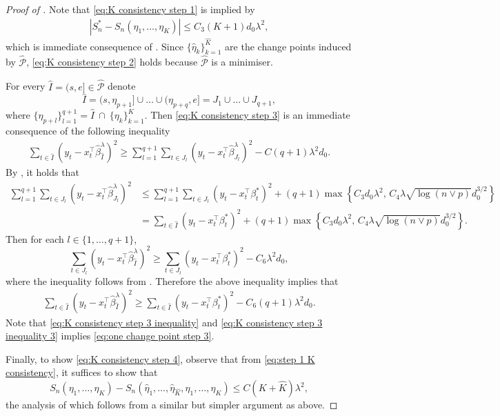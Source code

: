 \documentclass[twoside]{article}
\newcommand{\hatp}{ \widehat {\mathcal P}}
\begin{document}
\begin{proof}[Proof of ]
Note that \eqref{eq:K consistency step 1}  is implied by 
	\begin{align}\label{eq:step 1 K consistency}  
		\left| 	S^*_n   -   S_n(\eta_1,\ldots,\eta_K)    \right| \le  C_3(K+1) d_0 \lambda^2,
	\end{align}
	which is  immediate consequence  of .  Since $\{ \widehat \eta_{k}\}_{k=1}^{\widehat K}$ are the change points induced by $\widehat {\mathcal P}$, \eqref{eq:K consistency step 2} holds because $\hatp$ is a minimiser.

For every $\widehat I =(s,e]\in \hatp$ denote
	\[
		\widehat I  =  (s ,\eta_{p+1}]\cup \ldots \cup  (\eta_{p+q} ,e]  = J_1 \cup \ldots  \cup J_{q+1},
	\]
	where $\{ \eta_{p+l}\}_{l=1}^{q+1}  =\widehat I \ \cap \ \{\eta_k\}_{k=1}^K$. 
	Then \eqref{eq:K consistency step 3} is an immediate consequence of the following inequality
	\begin{align} \label{eq:one change point step 3}
		\sum_{t\in \widehat I }(y_t -x_t^{\top} \widehat \beta^\lambda_{\widehat I} )^2  \ge \sum_{l=1}^{q+1}  \sum_{t \in J_l}(y_t -x_t^{\top}  \widehat \beta^\lambda_{J_l})^2 - C(q+1) \lambda^2 d_0.
	\end{align}
	By , it holds that
	\begin{align} 
		\sum_{l=1}^{q+1}  \sum_{t \in J_l}(y_t -x_t^{\top}  \widehat \beta^\lambda_{J_l})^2 & \le \sum_{l=1}^{q+1} \sum_{t \in J_l}(y_t -x_t^{\top}    \beta^*_t  )^2  + (q+1) \max \left\{C_3 d_0\lambda^2, \, C_4\lambda \sqrt{\log(n \vee p)} d_0^{3/2} \right\} \nonumber \\
		& = \sum_{t\in \widehat I }(y_t -x_t^{\top}    \beta^*_t  )^2  + (q+1) \max \left\{C_3 d_0\lambda^2, \, C_4\lambda \sqrt{\log(n \vee p)} d_0^{3/2} \right\}.  \label{eq:K consistency step 3 inequality}
	\end{align}
	Then for each $l \in \{1, \ldots, q+1\}$,
	\[
		\sum_{t\in J_l }(y_t -x_t^{\top}  \widehat \beta^\lambda_{\widehat I}   )^2   \ge\sum_{t\in J_l}(y_t -x_t^{\top}\beta^*_t  )^2 - C_6\lambda^2 d_0,
	\]
	where  the  inequality follows from  .  Therefore the above inequality implies that 
	\begin{align} \label{eq:K consistency step 3 inequality  3}  \sum_{t\in \widehat I }(y_t -x_t^{\top}  \widehat \beta^\lambda_{\widehat I}   )^2   \ge\sum_{t\in \widehat I }(y_t -x_t^{\top}    \beta^*_t  )^2   -  C_6(q+1)\lambda^2 d_0.
	\end{align}
	Note that \eqref{eq:K consistency step 3 inequality} and  \eqref{eq:K consistency step 3 inequality 3} implies \eqref{eq:one change point step 3}.

Finally, to show \eqref{eq:K consistency step 4}, observe that from \eqref{eq:step 1 K consistency}, it suffices to show that 
	\[
		S_n(\eta_1,\ldots,\eta_K)  -  S_n ( \widehat \eta_{1},\ldots, \widehat \eta_{\widehat K } , \eta_1,\ldots,\eta_K )  \le C (K+\widehat K) \lambda^2,
	\]
	the analysis of which follows from a similar but simpler argument as above.
\end{proof} 
 
\end{document}
